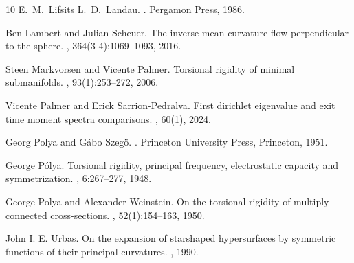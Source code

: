 \documentclass{amsart}
\theoremstyle{definition}
\theoremstyle{remark}
\begin{document}
\begin{thebibliography}{10}
E.~M.~Lifsits L.~D.~Landau.
.
\newblock Pergamon Press, 1986.

Ben Lambert and Julian Scheuer.
\newblock The inverse mean curvature flow perpendicular to the sphere.
, 364(3-4):1069--1093, 2016.

Steen {Markvorsen} and Vicente {Palmer}.
\newblock Torsional rigidity of minimal submanifolds.
,
  93(1):253–272, 2006.

Vicente {Palmer} and Erick {Sarrion-Pedralva}.
\newblock First dirichlet eigenvalue and exit time moment spectra comparisons.
, 60(1), 2024.

Georg {Polya} and Gábo {Szegö}.
.
\newblock Princeton University Press, Princeton, 1951.

George P{\'o}lya.
\newblock Torsional rigidity, principal frequency, electrostatic capacity and
  symmetrization.
, 6:267--277, 1948.

George {Polya} and Alexander {Weinstein}.
\newblock On the torsional rigidity of multiply connected cross-sections.
, 52(1):154--163, 1950.

{John I. E}. Urbas.
\newblock On the expansion of starshaped hypersurfaces by symmetric functions
  of their principal curvatures.
, 1990.

\end{thebibliography}
\end{document}
